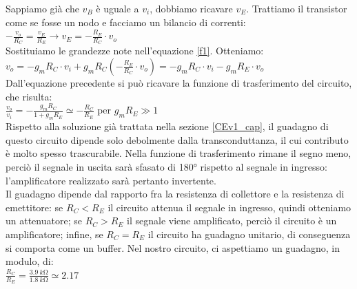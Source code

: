 \documentclass{report}
\begin{document}
Sappiamo già che $v_B$ è uguale a $v_i$, dobbiamo ricavare $v_E$. Trattiamo il transistor come se fosse un nodo e facciamo un bilancio di correnti:
\\[2pt]\indent$\displaystyle{-\frac{v_o}{R_C}=\frac{v_E}{R_E}\rightarrow v_E=-\frac{R_E}{R_C}\cdot v_o}$ 
\\[2pt]Sostituiamo le grandezze note nell'equazione \eqref{f1}. Otteniamo:
\\[2pt]\indent$\displaystyle{v_o=-g_mR_C\cdot v_i+g_mR_C \left( -\frac{R_E}{R_C}\cdot v_o \right)=-g_mR_C\cdot v_i-g_mR_E\cdot v_o}$
\\[2pt]Dall'equazione precedente si può ricavare la funzione di trasferimento del circuito, che risulta:
\\[2pt]\indent $\displaystyle{\frac{v_o}{v_i}=-\frac{g_mR_C}{1+g_mR_E}\simeq -\frac{R_C}{R_E}}$ per $g_mR_E\gg 1$
\\[2pt]Rispetto alla soluzione già trattata nella sezione \ref{CEv1_cap}, il guadagno di questo circuito dipende solo debolmente dalla transconduttanza, il cui contributo è molto spesso trascurabile. Nella funzione di trasferimento rimane il segno meno, perciò il segnale in uscita sarà sfasato di 180° rispetto al segnale in ingresso: l'amplificatore realizzato sarà pertanto invertente. 
\\\indent Il guadagno dipende dal rapporto fra la resistenza di collettore e la resistenza di emettitore: se $R_C<R_E$ il circuito attenua il segnale in ingresso, quindi otteniamo un attenuatore; se $R_C>R_E$ il segnale viene amplificato, perciò il circuito è un amplificatore; infine, se $R_C=R_E$ il circuito ha guadagno unitario, di conseguenza si comporta come un buffer. Nel nostro circuito, ci aspettiamo un guadagno, in modulo, di:
\\[2pt]\indent$\displaystyle{\frac{R_C}{R_E}=\frac{\SI{3.9}{k\ohm}}{\SI{1.8}{k\ohm}}\simeq 2.17}$
\end{document}
